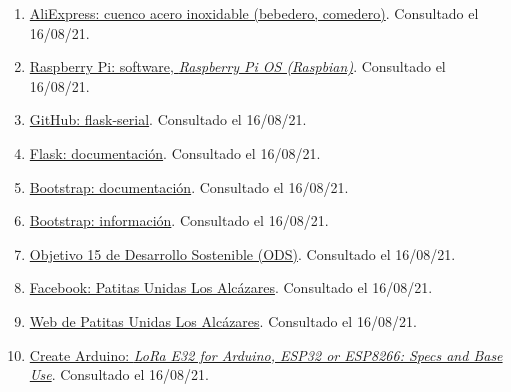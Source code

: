 \documentclass[12pt]{article}
\begin{document}
\begin{enumerate}
						
			\item 
			\label{bib: AliExpress cuenco}
			\href{https://es.aliexpress.com/item/1005001632098703.html?spm=a2g0s.9042311.0.0.274263c05XMd1Y}{AliExpress: cuenco acero inoxidable (bebedero, comedero)}. Consultado el 16/08/21.
			
						
			\item 
			\label{bib: raspbian}
			\href{https://www.raspberrypi.org/software/}{Raspberry Pi: software, \textit{Raspberry Pi OS (Raspbian)}}. Consultado el 16/08/21.
			
						
			\item 
			\label{bib: flask serial}
			\href{https://github.com/RedFalsh/flask-serial/blob/master/README.md}{GitHub: flask-serial}. Consultado el 16/08/21.
		
						
			\item 
			\label{bib: flask doc}
			\href{https://flask.palletsprojects.com/en/2.0.x/}{Flask: documentación}. Consultado el 16/08/21.
			
			
			\item 
			\label{bib: bootstrap doc}
			\href{https://getbootstrap.com/docs/5.0/getting-started/introduction/}{Bootstrap: documentación}. Consultado el 16/08/21.
			
			
			\item 
			\label{bib: bootstrap info}
			\href{https://rockcontent.com/es/blog/bootstrap/}{Bootstrap: información}. Consultado el 16/08/21.
			
			
			\item 
			\label{bib: ods}
			\href{https://www.un.org/sustainabledevelopment/es/biodiversity/}{Objetivo 15 de Desarrollo Sostenible (ODS)}. Consultado el 16/08/21.

			\item 
			\label{bib: fb patitas}
			\href{https://www.facebook.com/patitasunidaslosalcazares/}{Facebook: Patitas Unidas Los Alcázares}. Consultado el 16/08/21.

			\item 
			\label{bib: web patitas}
			\href{https://patitasunidas.org/}{Web de Patitas Unidas Los Alcázares}. Consultado el 16/08/21.

			\item 
			\label{bib: xreef proyect}
			\href{https://create.arduino.cc/projecthub/xreef/lora-e32-for-arduino-esp32-or-esp8266-specs-and-base-use-804d25}{Create Arduino: \textit{LoRa E32 for Arduino, ESP32 or ESP8266: Specs and Base Use}}. Consultado el 16/08/21.	


\end{enumerate}
\end{document}
